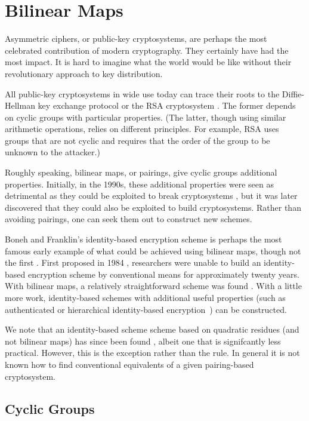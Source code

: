 \chapter{Bilinear Maps}

Asymmetric ciphers, or public-key cryptosystems, are perhaps
the most celebrated contribution of modern cryptography.
They certainly have had the most impact. It is hard to imagine
what the world would be like without their revolutionary
approach to key distribution.

All public-key cryptosystems in wide use today can trace their
roots to the Diffie-Hellman key exchange protocol \cite{diffie76new}
or the RSA cryptosystem \cite{RSA}.
The former depends on cyclic groups
with particular properties. (The latter, though
using similar arithmetic operations, relies on different principles.
For example, RSA uses groups that
are not cyclic and requires that the order of the group to be unknown
to the attacker.)

Roughly speaking, bilinear maps, or pairings,
give cyclic groups additional properties.
Initially, in the 1990s,
these additional properties were seen as detrimental
as they could be exploited to break cryptosystems \cite{mov, fr, fmr},
but it was later discovered
that they could also be exploited to build cryptosystems.
Rather than avoiding pairings, one can seek them out to construct new
schemes.

Boneh and Franklin's identity-based encryption scheme \cite{bf} is perhaps
the most famous early example of what could be achieved using
bilinear maps, though not the first \cite{sok, j}.
First proposed in 1984 \cite{shamir1984},
researchers were unable to build an identity-based encryption scheme by
conventional means for approximately
twenty years. 
With bilinear maps, a relatively straightforward scheme
was found \cite{bf}. With a little more work, identity-based schemes
with additional useful properties (such as authenticated or hierarchical
identity-based encryption~\cite{l, hl}) can be constructed.

We note that an identity-based scheme
scheme based on quadratic residues (and not bilinear maps)
has since been found \cite{cocks01}, albeit one that is signifcantly
less practical.
However, this is the exception rather than the rule. In general it is not
known how to find conventional
equivalents of a given pairing-based cryptosystem.

\section{Cyclic Groups}

